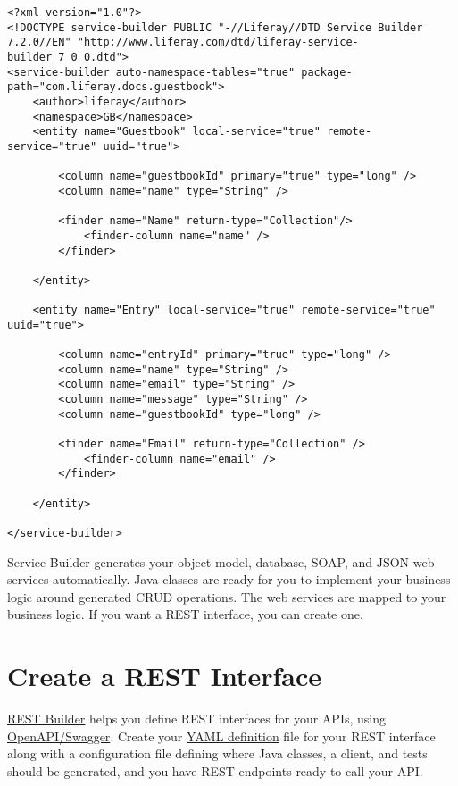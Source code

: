 \begin{verbatim}
<?xml version="1.0"?>
<!DOCTYPE service-builder PUBLIC "-//Liferay//DTD Service Builder 7.2.0//EN" "http://www.liferay.com/dtd/liferay-service-builder_7_0_0.dtd">
<service-builder auto-namespace-tables="true" package-path="com.liferay.docs.guestbook">
    <author>liferay</author>
    <namespace>GB</namespace>
    <entity name="Guestbook" local-service="true" remote-service="true" uuid="true">

        <column name="guestbookId" primary="true" type="long" />
        <column name="name" type="String" />

        <finder name="Name" return-type="Collection"/>
            <finder-column name="name" />
        </finder>

    </entity>

    <entity name="Entry" local-service="true" remote-service="true" uuid="true">
    
        <column name="entryId" primary="true" type="long" />
        <column name="name" type="String" />
        <column name="email" type="String" />
        <column name="message" type="String" />
        <column name="guestbookId" type="long" />

        <finder name="Email" return-type="Collection" />
            <finder-column name="email" />
        </finder>

    </entity>

</service-builder>
\end{verbatim}

Service Builder generates your object model, database, SOAP, and JSON
web services automatically. Java classes are ready for you to implement
your business logic around generated CRUD operations. The web services
are mapped to your business logic. If you want a REST interface, you can
create one.

\section{Create a REST Interface}\label{create-a-rest-interface}

\href{/docs/7-2/appdev/-/knowledge_base/a/rest-builder}{REST Builder}
helps you define REST interfaces for your APIs, using
\href{https://swagger.io/docs/specification/about/}{OpenAPI/Swagger}.
Create your
\href{https://swagger.io/docs/specification/basic-structure/}{YAML
definition} file for your REST interface along with a configuration file
defining where Java classes, a client, and tests should be generated,
and you have REST endpoints ready to call your API.

